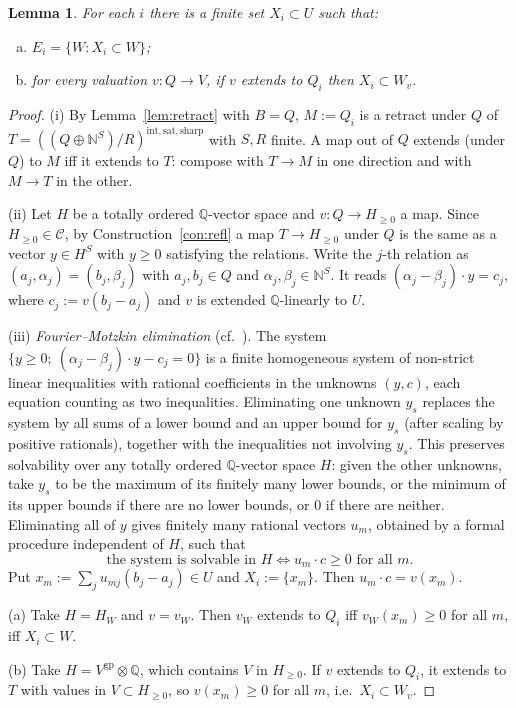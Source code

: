 \documentclass[11pt]{article}
\newtheorem{lemma}[theorem]{Lemma}
\theoremstyle{definition}
\theoremstyle{remark}
\newcommand{\N}{\mathbb{N}}
\newcommand{\QQ}{\mathbb{Q}}
\newcommand{\cC}{\mathcal{C}}
\newcommand{\gp}{\mathrm{gp}}
\newcommand{\rfl}{\mathrm{int,sat,sharp}}
\begin{document}
\begin{lemma}\label{lem:1}
For each $i$ there is a finite set $X_i\subset U$ such that:
\begin{enumerate}[(a)]
\item $E_i=\{W: X_i\subset W\}$;
\item for every valuation $v\colon Q\to V$, if $v$ extends to $Q_i$ then $X_i\subset W_v$.
\end{enumerate}
\end{lemma}
\begin{proof}
(i) By Lemma~\ref{lem:retract} with $B=Q$, $M:=Q_i$ is a retract under $Q$ of $T=((Q\oplus\N^S)/R)^{\rfl}$ with $S,R$ finite. A map out of $Q$ extends (under $Q$) to $M$ iff it extends to $T$: compose with $T\to M$ in one direction and with $M\to T$ in the other.

(ii) Let $H$ be a totally ordered $\QQ$-vector space and $v\colon Q\to H_{\ge0}$ a map. Since $H_{\ge0}\in\cC$, by Construction~\ref{con:refl} a map $T\to H_{\ge0}$ under $Q$ is the same as a vector $y\in H^S$ with $y\ge0$ satisfying the relations. Write the $j$-th relation as $(a_j,\alpha_j)=(b_j,\beta_j)$ with $a_j,b_j\in Q$ and $\alpha_j,\beta_j\in\N^S$. It reads $(\alpha_j-\beta_j)\cdot y=c_j$, where $c_j:=v(b_j-a_j)$ and $v$ is extended $\QQ$-linearly to $U$.

(iii) \emph{Fourier--Motzkin elimination} (cf.\ \cite{Schrijver}). The system $\{y\ge0;\ (\alpha_j-\beta_j)\cdot y-c_j=0\}$ is a finite homogeneous system of non-strict linear inequalities with rational coefficients in the unknowns $(y,c)$, each equation counting as two inequalities. Eliminating one unknown $y_s$ replaces the system by all sums of a lower bound and an upper bound for $y_s$ (after scaling by positive rationals), together with the inequalities not involving $y_s$. This preserves solvability over any totally ordered $\QQ$-vector space $H$: given the other unknowns, take $y_s$ to be the maximum of its finitely many lower bounds, or the minimum of its upper bounds if there are no lower bounds, or $0$ if there are neither. Eliminating all of $y$ gives finitely many rational vectors $u_m$, obtained by a formal procedure independent of $H$, such that
\[
\text{the system is solvable in }H\iff u_m\cdot c\ge0\text{ for all }m.
\]
Put $x_m:=\sum_ju_{mj}(b_j-a_j)\in U$ and $X_i:=\{x_m\}$. Then $u_m\cdot c=v(x_m)$.

(a) Take $H=H_W$ and $v=v_W$. Then $v_W$ extends to $Q_i$ iff $v_W(x_m)\ge0$ for all $m$, iff $X_i\subset W$.

(b) Take $H=V^{\gp}\otimes\QQ$, which contains $V$ in $H_{\ge0}$. If $v$ extends to $Q_i$, it extends to $T$ with values in $V\subset H_{\ge0}$, so $v(x_m)\ge0$ for all $m$, i.e.\ $X_i\subset W_v$.
\end{proof}
\end{document}
